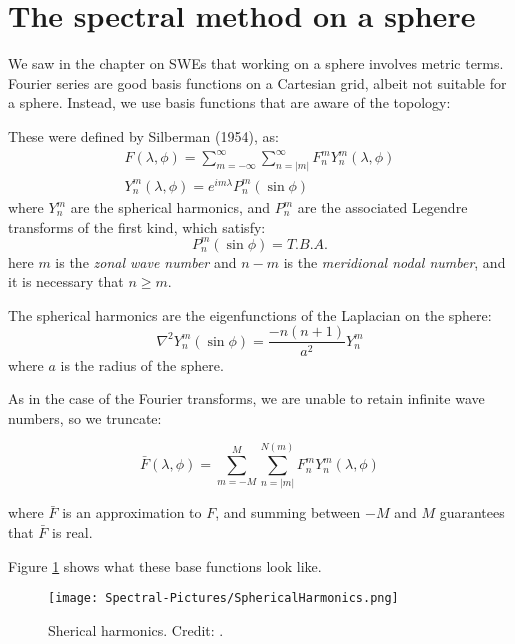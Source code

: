 \section{The spectral method on a sphere}
We saw in the chapter on SWEs that working on a sphere involves metric terms. Fourier series are good basis functions on a Cartesian grid, albeit not suitable for a sphere. Instead, we use basis functions that are aware of the topology:

\begin{definition}
	These were defined by Silberman (1954), as:
	\begin{eqnarray}
		F(\lambda, \phi)= \sum_{m=-\infty}^{\infty} \sum_{n=|m|}^{\infty} F_n^m Y_n^m (\lambda, \phi)\\
		Y_n^m (\lambda, \phi) = e^{im \lambda} P_n^m (\sin \phi)
	\end{eqnarray}
	where $Y_n^m$ are the spherical harmonics, and  $P_n^m$ are the associated Legendre transforms of the first kind, which satisfy:
	\begin{equation}
		P_n^m (\sin \phi) = T.B.A.
		\end{equation}
	here $m$ is the \emph{zonal wave number} and $n-m$ is the  \emph{meridional nodal number}, and it is necessary that $n \ge m$.
\end{definition}

The spherical harmonics are the eigenfunctions of the Laplacian on the sphere:
	\begin{equation}
	\nabla^2 Y_n^m (\sin \phi) = \frac{-n(n+1)}{a^2} Y_n^m
\end{equation}
where $a$ is the radius of the sphere.

As in the case of the Fourier transforms, we are unable to retain infinite wave numbers, so we truncate:

\begin{equation}
	\bar{F}(\lambda, \phi)= \sum_{m=-M}^{M} \sum_{n=|m|}^{N(m)} F_n^m Y_n^m (\lambda, \phi)
\end{equation}

where $\bar{F}$ is an approximation to $F$, and summing between $-M$ and $M$ guarantees that $\bar{F}$ is real. 

Figure \ref{fig:SphericalHarmonics} shows what these base functions look like. 

\begin{figure}[h!]
	\begin{center}
		\texttt{[image: Spectral-Pictures/SphericalHarmonics.png]}
	\end{center}
	\label{fig:SphericalHarmonics}
	\caption{Sherical harmonics. Credit: .}
\end{figure}

